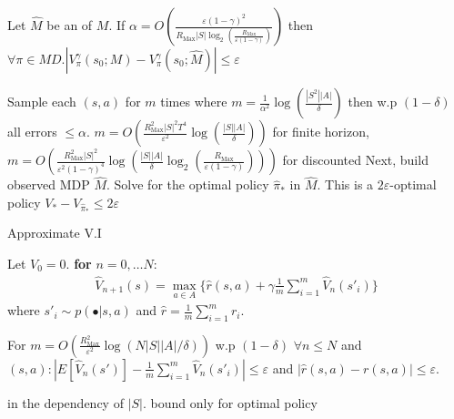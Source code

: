 \begin{thm} Let $\hat{M}$ be an  of $M$. If $\alpha = O\left( \frac{\varepsilon(1-\gamma)^2}{R_{\text{Max}}|S| \log_2\left(\frac{R_{\text{Max}}}{\varepsilon(1-\gamma)}\right)} \right)$ then $\forall \pi \in MD. |V^\gamma_{\pi}(s_0 ; M) - V^\gamma_{\pi}(s_0 ; \hat{M})| \leq \varepsilon$\end{thm}
\begin{thm} Sample each $(s, a)$ for $m$ times where $m = \frac{1}{\alpha^2} \log\left(\frac{|S^2| |A|}{\delta}\right)$ then w.p $(1 - \delta)$ all errors $\leq \alpha$. $m = O\left( \frac{R_{\text{Max}}^2 |S|^2 T^4}{\varepsilon^2} \log\left(\frac{|S||A|}{\delta}\right) \right)$ for finite horizon, $m = O\left( \frac{R_{\text{Max}}^2 |S|^2}{\varepsilon^2 (1-\gamma)^4} \log\left(\frac{|S||A|}{\delta}\log_2\left(\frac{R_{\text{Max}}}{\varepsilon(1-\gamma)}\right)\right) \right)$ for discounted
Next, build observed MDP $\hat{M}$. Solve for the optimal policy $\hat{\pi}_*$ in $\hat{M}$. This is a $2\varepsilon$-optimal policy $V_* - V_{\hat{\pi}_*} \leq 2\varepsilon$\end{thm}
\begin{greyboxedalgorithm}
\vspace{-0.5cm}
\begin{algorithm}[H]
\caption{Approximate V.I  }
\begin{footnotesize}
\begin{algorithmic}[1]
\STATE Let $V_0 = 0$. 
\STATE \textbf{for} $n = 0,\ldots N$:
   \begin{align*} \hat{V}_{n+1}(s) = \max_{a \in A} \{\hat{r}(s, a) + \gamma \frac{1}{m} \sum_{i=1}^{m} \hat{V}_n(s'_i)\}
    \end{align*} 
 where $s'_i \sim p(\bullet |s, a)$ and $\hat{r}= \frac{1}{m} \sum_{i=1}^{m} r_i$.
\end{algorithmic}
\end{footnotesize}
\end{algorithm}
\end{greyboxedalgorithm}
\begin{thm}
 For $m = O\left( \frac{R_{\text{Max}}^2}{\varepsilon^2} \log \left(N|S||A|/\delta\right) \right)$ w.p $(1 - \delta)$ $\forall n \leq N$ and $(s, a): |E[\hat{V}_n(s')] - \frac{1}{m}\sum_{i=1}^{m} \hat{V}_n(s'_i)| \leq \varepsilon$ and $|\hat{r}(s, a) - r(s, a)| \leq \varepsilon$.\end{thm}  in the dependency of $|S|$.  bound only for optimal policy
